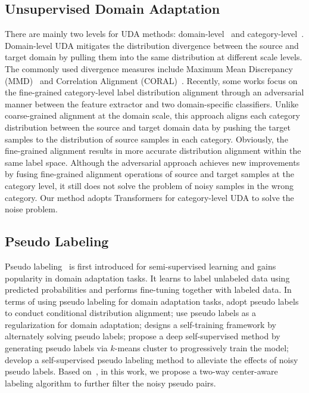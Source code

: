 \documentclass[dvipsnames, svgnames, x11names, table]{article} \usepackage{iclr2022_conference,times}
\begin{document}
\begin{spacing}{1.0}
\subsection{Unsupervised Domain Adaptation}
There are mainly two levels for UDA methods: domain-level~\citep{tzeng2014deep,long2015learning,ghifary2016deep,tzeng2017adversarial,bousmalis2017unsupervised,hoffman2018cycada} and  category-level~\citep{saito2018maximum,kang2019contrastive,du2021cross,li2021cross}. Domain-level UDA mitigates the distribution divergence between the source and target domain by pulling them into the same distribution at different scale levels.  The commonly used divergence measures include Maximum Mean Discrepancy (MMD)~\citep{gretton2006kernel,tzeng2014deep,long2015learning} and Correlation Alignment (CORAL)~\citep{sun2016return,sun2016deep}.  Recently, some works \citep{saito2018maximum,du2021cross,li2021cross} focus on the fine-grained category-level label distribution alignment through an adversarial manner between the feature extractor and two domain-specific classifiers.  Unlike coarse-grained alignment at the domain scale, this approach aligns each category distribution between the source and target domain data by pushing the target samples to the distribution of source samples in each category. Obviously, the fine-grained alignment results in more accurate distribution alignment within the same label space. Although the adversarial approach achieves new improvements by fusing fine-grained alignment operations of source and target samples at the category level, it still does not solve the problem of noisy samples in the wrong category. Our method adopts Transformers for category-level UDA to solve the noise problem. 


\subsection{Pseudo Labeling}
Pseudo labeling~\citep{lee2013pseudo} is first introduced for semi-supervised learning and gains popularity in domain adaptation tasks. It learns to label unlabeled data using predicted probabilities and performs fine-tuning together with labeled data. In terms of using pseudo labeling for domain adaptation tasks, \citep{long2017deep,long2017conditional} adopt pseudo labels  to conduct conditional distribution alignment; \citep{zhang2018collaborative,choi2019pseudo} use pseudo labels as a regularization for domain adaptation; \citet{zou2018unsupervised} designs a self-training framework by alternately solving pseudo labels; \citet{caron2018deep} propose a deep self-supervised method by generating pseudo labels via $k$-means cluster to progressively train the model; \citet{liang2020we} develop a self-supervised pseudo labeling method to alleviate the effects of noisy pseudo labels. Based on~\citet{liang2020we}, in this work, we propose a two-way center-aware labeling algorithm to further filter the noisy pseudo pairs. 


\end{spacing}
\end{document}
